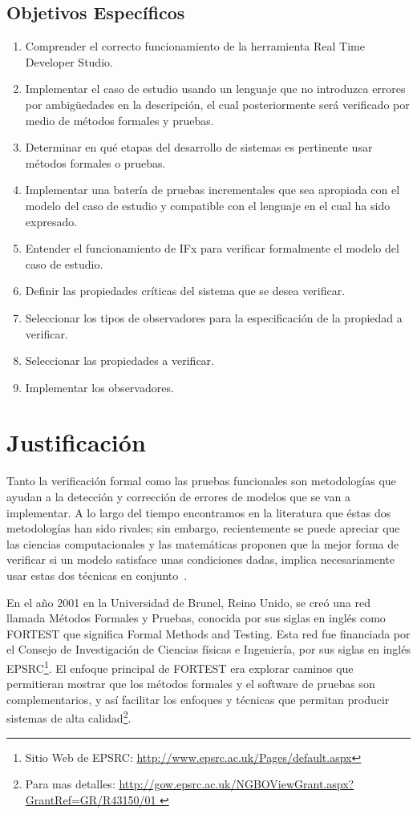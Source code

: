 \subsection{Objetivos Espec\'ificos}
\begin{enumerate}
 \item Comprender el correcto funcionamiento de la herramienta Real Time 
Developer Studio.
\item Implementar el caso de estudio usando un lenguaje que no introduzca 
errores por ambig\"uedades en la descripci\'on, el cual posteriormente ser\'a 
verificado por medio de m\'etodos formales y pruebas.
\item Determinar en qu\'e etapas del desarrollo de sistemas es pertinente usar 
m\'etodos formales o pruebas.
\item Implementar una bater\'ia de pruebas incrementales que sea apropiada con 
el modelo del caso de estudio y compatible con el lenguaje en el cual ha sido 
expresado.
\item Entender el funcionamiento de IFx para verificar formalmente el modelo 
del caso de estudio.
\item Definir las propiedades cr\'iticas del sistema que se desea verificar.
\item Seleccionar los tipos de observadores para la especificaci\'on de la 
propiedad a verificar.
\item Seleccionar las propiedades a verificar.
\item Implementar los observadores.
\end{enumerate}

\section{Justificaci\'on}

Tanto la verificaci\'on formal como las pruebas funcionales son metodolog\'ias 
que ayudan a la detecci\'on y correcci\'on de errores de modelos que se van a 
implementar. A lo largo del tiempo encontramos en la literatura que \'estas dos 
metodolog\'ias han sido rivales; sin embargo, recientemente se puede apreciar 
que las ciencias computacionales y las matem\'aticas proponen que la mejor forma 
de verificar si un modelo satisface unas condiciones dadas, implica 
necesariamente usar estas dos t\'ecnicas en conjunto~\cite{Gaudel1996}. 

En el a\~no 2001 en la Universidad de Brunel, Reino Unido, se cre\'o una red 
llamada M\'etodos Formales y Pruebas, conocida por sus siglas en ingl\'es como 
FORTEST que significa Formal Methods and Testing. Esta red fue financiada por el 
Consejo de Investigaci\'on de Ciencias f\'isicas e Ingenier\'ia, por sus siglas 
en ingl\'es EPSRC\footnote{Sitio Web de 
EPSRC: \url{http://www.epsrc.ac.uk/Pages/default.aspx}}. El enfoque principal 
de 
FORTEST era explorar caminos que 
permitieran mostrar que los m\'etodos formales y el software de pruebas son 
complementarios, y as\'i facilitar los enfoques y t\'ecnicas 	que permitan 
producir sistemas de alta 
calidad\footnote{Para mas detalles:
\url{http://gow.epsrc.ac.uk/NGBOViewGrant.aspx?GrantRef=GR/R43150/01 
}}.

